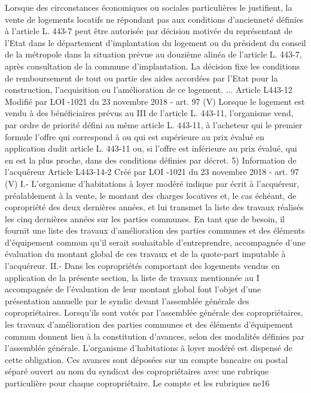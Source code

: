\documentclass[11pt,a4paper]{report}
\begin{document}
	Lorsque des circonstances économiques ou sociales particulières le justifient, la vente de logements locatifs ne
	répondant pas aux conditions d'ancienneté définies à l'article L. 443-7 peut être autorisée par décision motivée
	du représentant de l'Etat dans le département d'implantation du logement ou du président du conseil de la
	métropole dans la situation prévue au douzième alinéa de l'article L. 443-7, après consultation de la commune
	d'implantation. La décision fixe les conditions de remboursement de tout ou partie des aides accordées par l'Etat
	pour la construction, l'acquisition ou l'amélioration de ce logement.
	...
	Article L443-12 Modifié par LOI -1021 du 23 novembre 2018 - art. 97 (V)
	Lorsque le logement est vendu à des bénéficiaires prévus au III de l'article L. 443-11, l'organisme vend, par
	ordre de priorité défini au même article L. 443-11, à l'acheteur qui le premier formule l'offre qui correspond à
	ou qui est supérieure au prix évalué en application dudit article L. 443-11 ou, si l'offre est inférieure au prix
	évalué, qui en est la plus proche, dans des conditions définies par décret.
	5)
	Information de l’acquéreur
	Article L443-14-2 Créé par LOI -1021 du 23 novembre 2018 - art. 97 (V)
	I.- L'organisme d'habitations à loyer modéré indique par écrit à l'acquéreur, préalablement à la vente, le
	montant des charges locatives et, le cas échéant, de copropriété des deux dernières années, et lui transmet la
	liste des travaux réalisés les cinq dernières années sur les parties communes. En tant que de besoin, il fournit
	une liste des travaux d'amélioration des parties communes et des éléments d'équipement commun qu'il serait
	souhaitable d'entreprendre, accompagnée d'une évaluation du montant global de ces travaux et de la quote-part
	imputable à l'acquéreur.
	II.- Dans les copropriétés comportant des logements vendus en application de la présente section, la liste de
	travaux mentionnée au I accompagnée de l'évaluation de leur montant global font l'objet d'une présentation
	annuelle par le syndic devant l'assemblée générale des copropriétaires.
	Lorsqu'ils sont votés par l'assemblée générale des copropriétaires, les travaux d'amélioration des parties
	communes et des éléments d'équipement commun donnent lieu à la constitution d'avances, selon des modalités
	définies par l'assemblée générale. L'organisme d'habitations à loyer modéré est dispensé de cette obligation.
	Ces avances sont déposées sur un compte bancaire ou postal séparé ouvert au nom du syndicat des
	copropriétaires avec une rubrique particulière pour chaque copropriétaire. Le compte et les rubriques ne16
\end{document}
